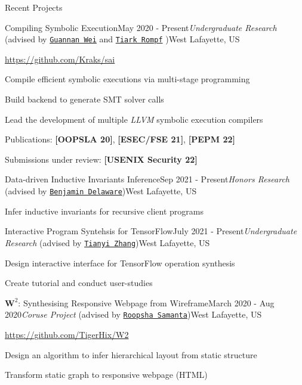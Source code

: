 \documentclass{resume} %
\begin{document}
\begin{rSection}{Recent Projects}

\begin{rSubsection}{Compiling Symbolic Execution}{May 2020 - Present}{\textit{Undergraduate Research} (advised by \href{http://continuation.passing.style/}{\texttt{Guannan Wei}} and \href{http://tiarkrompf.github.io/}{\texttt{Tiark Rompf}} )}{West Lafayette, US}
\item \url{https://github.com/Kraks/sai}
\item Compile efficient symbolic executions via multi-stage programming
\item Build backend to generate SMT solver calls
\item Lead the development of multiple \textit{LLVM} symbolic execution compilers
\item Publications: \textbf{[OOPSLA 20]}, \textbf{[ESEC/FSE 21]}, \textbf{[PEPM 22]}
\item Submissions under review: \textbf{[USENIX Security 22]}
\end{rSubsection}

\begin{rSubsection}{Data-driven Inductive Invariants Inference}{Sep 2021 - Present}{\textit{Honors Research} (advised by \href{https://www.cs.purdue.edu/homes/bendy/}{\texttt{Benjamin Delaware}})}{West Lafayette, US}
    \item Infer inductive invariants for recursive client programs
\end{rSubsection}

\begin{rSubsection}{Interactive Program Syntehsis for TensorFlow}{July 2021 - Present}{\textit{Undergraduate Research} (advised by \href{https://tianyi-zhang.github.io/}{\texttt{Tianyi Zhang}})}{West Lafayette, US}
    \item Design interactive interface for TensorFlow operation synthesis
    \item Create tutorial and conduct user-studies
\end{rSubsection}

\begin{rSubsection}{$\mathbf{W}^2$: Synthesising Responsive Webpage from Wireframe}{March 2020 - Aug 2020}{\textit{Coruse Project} (advised by \href{https://www.cs.purdue.edu/homes/roopsha/}{\texttt{Roopsha Samanta}})}{West Lafayette, US}
\item \url{https://github.com/TigerHix/W2}
\item Design an algorithm to infer hierarchical layout from static structure
\item Transform static graph to responsive webpage (HTML)
\end{rSubsection}


\end{rSection}
\end{document}
